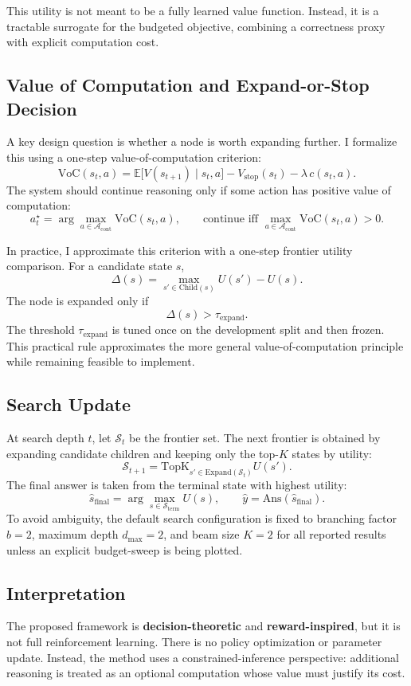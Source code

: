 \documentclass[10pt]{article}
\begin{document}
This utility is not meant to be a fully learned value function. Instead, it is a tractable surrogate for the budgeted objective, combining a correctness proxy with explicit computation cost.

\subsection{Value of Computation and Expand-or-Stop Decision}
A key design question is whether a node is worth expanding further. I formalize this using a one-step value-of-computation criterion:
\[
\mathrm{VoC}(s_t,a)=
\mathbb{E}\big[V(s_{t+1})\mid s_t,a\big]
-
V_{\mathrm{stop}}(s_t)
-
\lambda\,c(s_t,a).
\]
The system should continue reasoning only if some action has positive value of computation:
\[
a_t^\star=\arg\max_{a\in\mathcal{A}_{\mathrm{cont}}}\mathrm{VoC}(s_t,a),
\qquad
\text{continue iff }
\max_{a\in\mathcal{A}_{\mathrm{cont}}}\mathrm{VoC}(s_t,a)>0.
\]

In practice, I approximate this criterion with a one-step frontier utility comparison. For a candidate state $s$,
\[
\Delta(s)=
\max_{s'\in\mathrm{Child}(s)}U(s')-U(s).
\]
The node is expanded only if
\[
\Delta(s)>\tau_{\mathrm{expand}}.
\]
The threshold $\tau_{\mathrm{expand}}$ is tuned once on the development split and then frozen. This practical rule approximates the more general value-of-computation principle while remaining feasible to implement.

\subsection{Search Update}
At search depth $t$, let $\mathcal{S}_t$ be the frontier set. The next frontier is obtained by expanding candidate children and keeping only the top-$K$ states by utility:
\[
\mathcal{S}_{t+1}
=
\mathrm{TopK}_{s'\in\mathrm{Expand}(\mathcal{S}_t)}U(s').
\]
The final answer is taken from the terminal state with highest utility:
\[
\hat s_{\mathrm{final}}
=
\arg\max_{s\in\mathcal{S}_{\mathrm{term}}}U(s),
\qquad
\hat y=\mathrm{Ans}(\hat s_{\mathrm{final}}).
\]
To avoid ambiguity, the default search configuration is fixed to branching factor $b=2$, maximum depth $d_{\max}=2$, and beam size $K=2$ for all reported results unless an explicit budget-sweep is being plotted.

\subsection{Interpretation}
The proposed framework is \textbf{decision-theoretic} and \textbf{reward-inspired}, but it is not full reinforcement learning. There is no policy optimization or parameter update. Instead, the method uses a constrained-inference perspective: additional reasoning is treated as an optional computation whose value must justify its cost.
\end{document}
